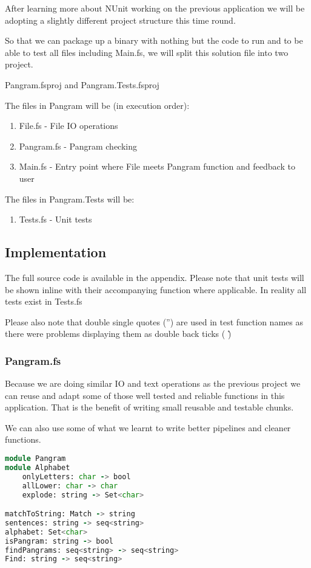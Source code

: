 After learning more about NUnit working on the previous application we will be
adopting a slightly different project structure this time round.

So that we can package up a binary with nothing but the code to run and to be able
to test all files including Main.fs, we will split this solution file into two project.

Pangram.fsproj and Pangram.Tests.fsproj

The files in Pangram will be (in execution order):
\begin{enumerate}
  \item File.fs - File IO operations
  \item Pangram.fs - Pangram checking
  \item Main.fs - Entry point where File meets Pangram function and feedback to user
\end{enumerate}

The files in Pangram.Tests will be:
\begin{enumerate}
  \item Tests.fs - Unit tests
\end{enumerate}

\subsection{Implementation}

The full source code is available in the appendix. Please note that unit tests will be shown inline
with their accompanying function where applicable. In reality all tests exist in Tests.fs

Please also note that double single quotes ('') are used in test function names
as there were problems displaying them as double back ticks ( \` )

\subsubsection{Pangram.fs}

Because we are doing similar IO and text operations as the previous project we can reuse and adapt some
of those well tested and reliable functions in this application. That is the benefit of writing small
reusable and testable chunks.

We can also use some of what we learnt to write better pipelines and cleaner functions.

\begin{lstlisting}[language=F]
module Pangram
module Alphabet
    onlyLetters: char -> bool
    allLower: char -> char
    explode: string -> Set<char>

matchToString: Match -> string
sentences: string -> seq<string>
alphabet: Set<char>
isPangram: string -> bool
findPangrams: seq<string> -> seq<string>
Find: string -> seq<string>
\end{lstlisting}

